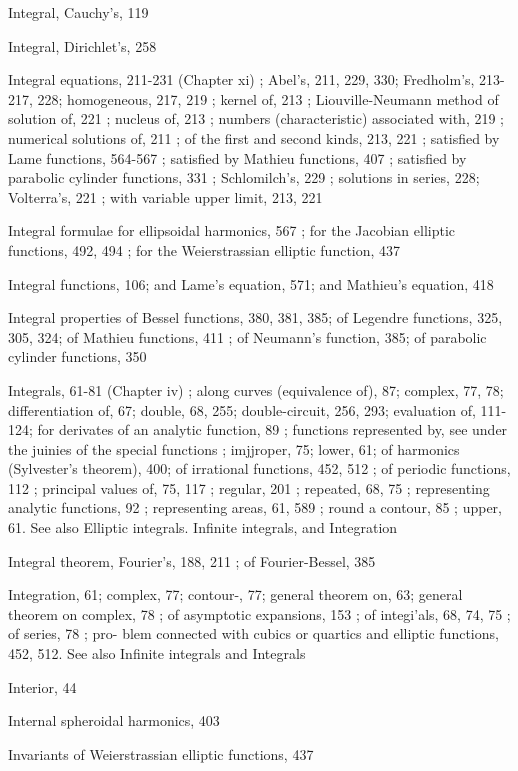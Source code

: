 Integral, Cauchy's, 119

Integral, Dirichlet's, 258

Integral equations, 211-231 (Chapter xi) ; Abel's, 211, 229, 330; Fredholm's, 213-217, 228;
homogeneous, 217, 219 ; kernel of, 213 ; Liouville-Neumann method of solution of, 221 ;
nucleus of, 213 ; numbers (characteristic) associated with, 219 ; numerical solutions of, 211 ;
of the first and second kinds, 213, 221 ; satisfied by Lame functions, 564-567 ; satisfied by
Mathieu functions, 407 ; satisfied by parabolic cylinder functions, 331 ; Schlomilch's, 229 ;
solutions in series, 228; Volterra's, 221 ; with variable upper limit, 213, 221

Integral formulae for ellipsoidal harmonics, 567 ; for the Jacobian elliptic functions, 492, 494 ;
for the Weierstrassian elliptic function, 437

Integral functions, 106; and Lame's equation, 571; and Mathieu's equation, 418

Integral properties of Bessel functions, 380, 381, 385; of Legendre functions, 325, 305, 324; of
Mathieu functions, 411 ; of Neumann's function, 385; of parabolic cylinder functions, 350

Integrals, 61-81 (Chapter iv) ; along curves (equivalence of), 87; complex, 77, 78; differentiation
of, 67; double, 68, 255; double-circuit, 256, 293; evaluation of, 111-124; for derivates of an
analytic function, 89 ; functions represented by, see under the juinies of the special functions ;
imjjroper, 75; lower, 61; of harmonics (Sylvester's theorem), 400; of irrational functions,
452, 512 ; of periodic functions, 112 ; principal values of, 75, 117 ; regular, 201 ; repeated,
68, 75 ; representing analytic functions, 92 ; representing areas, 61, 589 ; round a contour,
85 ; upper, 61. See also Elliptic integrals. Infinite integrals, and Integration

Integral theorem, Fourier's, 188, 211 ; of Fourier-Bessel, 385

Integration, 61; complex, 77; contour-, 77; general theorem on, 63; general theorem on
complex, 78 ; of asymptotic expansions, 153 ; of integi'als, 68, 74, 75 ; of series, 78 ; pro-
blem connected with cubics or quartics and elliptic functions, 452, 512. See also Infinite
integrals and Integrals

Interior, 44

Internal spheroidal harmonics, 403

Invariants of Weierstrassian elliptic functions, 437

